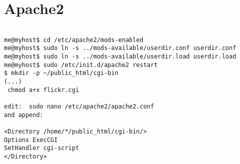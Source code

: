\documentclass[12pt]{article}
\begin{document}
\section{Apache2}

\begin{lstlisting}

me@myhost$ cd /etc/apache2/mods-enabled
me@myhost$ sudo ln -s ../mods-available/userdir.conf userdir.conf
me@myhost$ sudo ln -s ../mods-available/userdir.load userdir.load
me@myhost$ sudo /etc/init.d/apache2 restart 
$ mkdir -p ~/public_html/cgi-bin
(...)
 chmod a+x flickr.cgi
 
edit:  sudo nano /etc/apache2/apache2.conf
and append:

<Directory /home/*/public_html/cgi-bin/>
Options ExecCGI
SetHandler cgi-script
</Directory>
\end{lstlisting}
\end{document}
